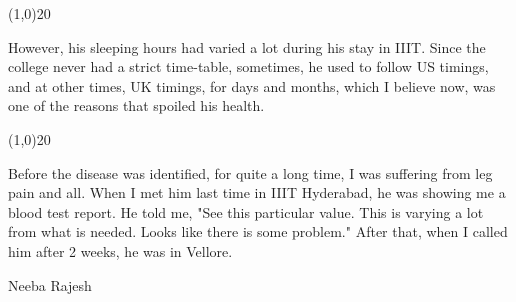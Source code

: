 \begin{english}
\begin{center}
\line(1,0){20} 
\end{center}
However, his sleeping hours had varied a lot during his stay in IIIT. Since the college never had a strict time-table, sometimes, he used to follow US timings, and at other times, UK timings, for days and months, which I believe now, was one of the reasons that spoiled his health.
\begin{center}
\line(1,0){20} 
\end{center}
Before the disease was identified, for quite a long time, I was suffering from leg pain and all. When I met him last time in IIIT Hyderabad, he was showing me a blood test report. He told me, "See this particular value. This is varying a lot from what is needed. Looks like there is some problem." After that, when I called him after 2 weeks, he was in Vellore.

\begin{flushright}Neeba Rajesh\end{flushright}
\end{english}
\newpage
